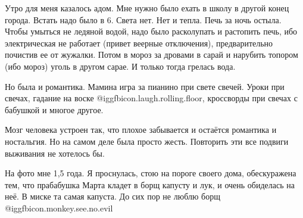 Утро для меня казалось адом. Мне нужно было ехать в школу в другой конец
города. Встать надо было в 6. Света нет. Нет и тепла. Печь за ночь остыла.
Чтобы умыться не ледяной водой, надо было расколупать и растопить печь, ибо
электрическая не работает (привет веерные отключения), предварительно почистив
ее от жужалки. Потом в мороз за дровами в сарай и нарубить топором (ибо мороз)
уголь в другом сарае. И только тогда грелась вода. 

Но была и романтика. Мамина игра за пианино при свете свечей. Уроки при свечах,
гадание на воске @igg{fbicon.laugh.rolling.floor}, кроссворды при свечах с бабушкой и многое другое. 

Мозг человека устроен так, что плохое забывается и остаётся романтика и
ностальгия. Но на самом деле была просто жесть. Повторить эти все подвиги
выживания не хотелось бы. 

На фото мне 1,5 года. Я проснулась, стою на пороге своего дома, обескуражена
тем, что прабабушка Марта кладет в борщ капусту и лук, и очень обиделась на
неё. В миске та самая капуста. До сих пор не люблю борщ @igg{fbicon.monkey.see.no.evil} 

